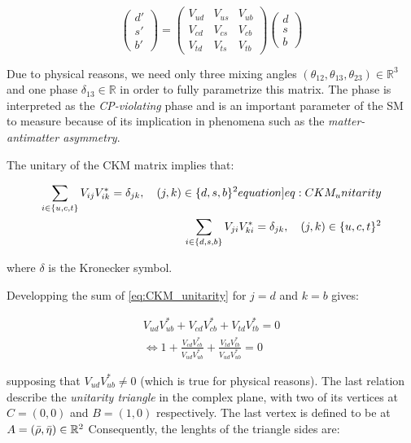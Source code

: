 \begin{equation}
    \begin{pmatrix}
        d' \\
        s' \\
        b'
    \end{pmatrix}
    =
    \begin{pmatrix}
        V_{ud} & V_{us} & V_{ub} \\
        V_{cd} & V_{cs} & V_{cb} \\
        V_{td} & V_{ts} & V_{tb}
    \end{pmatrix}
    \begin{pmatrix}
        d \\
        s \\
        b
    \end{pmatrix}
\end{equation}

Due to physical reasons, we need only three mixing angles $\left(\theta_{12}, \theta_{13}, \theta_{23}\right) \in \mathbb{R}^3$ and one phase $\delta_{13} \in \mathbb{R}$ in order to fully parametrize this matrix.
The phase is interpreted as the \textit{CP-violating} phase and is an important parameter of the \gls{SM} to measure because of its implication in phenomena such as the \textit{matter-antimatter asymmetry}.

The unitary of the \gls{CKM} matrix implies that:

\begin{align}
    \sum_{i \in \{u, c, t\}} V_{ij}V_{ik}^* =  \delta_{jk}, \quad \left(j, k\right) \in \{d, s, b\}^2 \label[equation]{eq:CKM_unitarity} \\ 
    \sum_{i \in \{d, s, b\}} V_{ji}V_{ki}^* = \delta_{jk}, \quad \left(j, k\right) \in \{u, c, t\}^2
\end{align}

where $\delta$ is the Kronecker symbol.

Developping the sum of \cref{eq:CKM_unitarity} for $j = d$ and $k = b$ gives:

\begin{align}
    V_{ud}V_{ub}^* + V_{cd}V_{cb}^* + V_{td}V_{tb}^* = 0 \\
    \Longleftrightarrow 1 + \frac{V_{cd}V_{cb}^*}{V_{ud}V_{ub}^*} + \frac{V_{td}V_{tb}^*}{V_{ud}V_{ub}^*} = 0
\end{align}

supposing that $V_{ud}V_{ub}^* \neq 0$ (which is true for physical reasons).
The last relation describe the \textit{unitarity triangle} in the complex plane, with two of its vertices at $C = (0, 0)$ and $B = (1, 0)$ respectively.
The last vertex is defined to be at $A = (\Bar{\rho}, \Bar{\eta}) \in \mathbb{R}^2$
Consequently, the lenghts of the triangle sides are:

